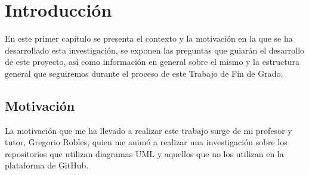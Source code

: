 \documentclass[a4paper, 12pt]{book}
\begin{document}


\tableofcontents 
\cleardoublepage
\listoffigures %



\cleardoublepage
\chapter{Introducción}
\label{chap:introducción}
\label{sec:intro} %


En este primer capítulo se presenta el contexto y la motivación en la que se ha desarrollado esta investigación, se exponen las preguntas que guiarán el desarrollo de este proyecto, así como información en general sobre el mismo y la estructura general que seguiremos durante el proceso de este Trabajo de Fin de Grado.


\section{Motivación} %
\label{sec:motivación} %

La motivación que me ha llevado a realizar este trabajo surge de mi profesor y tutor, Gregorio Robles, quien me animó a realizar una investigación sobre los repositorios que utilizan diagramas UML y aquellos que no los utilizan en la plataforma de GitHub.
\end{document}
